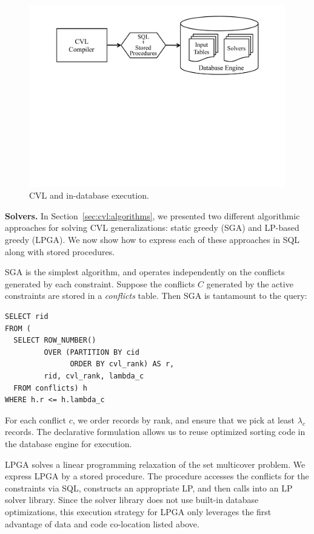 \documentclass[11pt, oneside]{report}
\newcommand{\minisec}[1]{\noindent\textbf{#1.}}
\begin{document}
\begin{figure}[htbp]
\begin{center}
\includegraphics[scale=.35,viewport=400 375 450 550]{figs-cvl/indatabase-execution.pdf}
\caption{CVL and in-database execution.}
\label{fig:indatabase}
\end{center}
\vspace*{-1ex}
\end{figure}

\minisec{Solvers}
In Section~\ref{sec:cvl:algorithms}, we presented two different algorithmic approaches for solving CVL generalizations: static greedy (SGA) and LP-based greedy (LPGA). We now show how to express each of these approaches in SQL along with stored procedures. 

SGA is the simplest algorithm, and operates independently on the conflicts generated by each constraint. Suppose the conflicts $C$ generated by the active constraints are stored in a \emph{conflicts} table. Then SGA is tantamount to the query:

\begin{lstlisting}
SELECT rid
FROM (
  SELECT ROW_NUMBER() 
         OVER (PARTITION BY cid
               ORDER BY cvl_rank) AS r,
         rid, cvl_rank, lambda_c
  FROM conflicts) h
WHERE h.r <= h.lambda_c
\end{lstlisting}

For each conflict $c$, we order records by rank, and ensure that we pick at least $\lambda_c$ records. The declarative formulation allows us to reuse optimized sorting code in the database engine for execution.

LPGA solves a linear programming relaxation of the set multicover problem. We express LPGA by a stored procedure. The procedure accesses the conflicts for the constraints via SQL, constructs an appropriate LP, and then calls into an LP solver library. Since the solver library does not use built-in database optimizations, this execution strategy for LPGA only leverages the first advantage of data and code co-location listed above.
\end{document}
